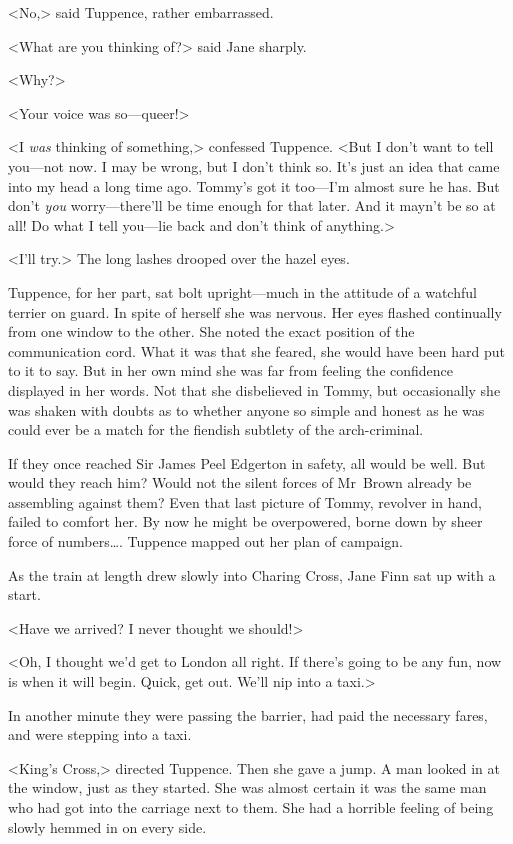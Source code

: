 <No,> said Tuppence, rather embarrassed.

<What are you thinking of?> said Jane sharply.

<Why?>

<Your voice was so—queer!>

<I \emph{was} thinking of something,> confessed Tuppence. <But I don't want to tell you—not now. I may be wrong, but I don't think so. It's just an idea that came into my head a long time ago. Tommy's got it too—I'm almost sure he has. But don't \emph{you} worry—there'll be time enough for that later. And it mayn't be so at all! Do what I tell you—lie back and don't think of anything.>

<I'll try.> The long lashes drooped over the hazel eyes.

Tuppence, for her part, sat bolt upright—much in the attitude of a watchful terrier on guard. In spite of herself she was nervous. Her eyes flashed continually from one window to the other. She noted the exact position of the communication cord. What it was that she feared, she would have been hard put to it to say. But in her own mind she was far from feeling the confidence displayed in her words. Not that she disbelieved in Tommy, but occasionally she was shaken with doubts as to whether anyone so simple and honest as he was could ever be a match for the fiendish subtlety of the arch-criminal.

If they once reached Sir James Peel Edgerton in safety, all would be well. But would they reach him? Would not the silent forces of Mr~Brown already be assembling against them? Even that last picture of Tommy, revolver in hand, failed to comfort her. By now he might be overpowered, borne down by sheer force of numbers\dots. Tuppence mapped out her plan of campaign.

As the train at length drew slowly into Charing Cross, Jane Finn sat up with a start.

<Have we arrived? I never thought we should!>

<Oh, I thought we'd get to London all right. If there's going to be any fun, now is when it will begin. Quick, get out. We'll nip into a taxi.>

In another minute they were passing the barrier, had paid the necessary fares, and were stepping into a taxi.

<King's Cross,> directed Tuppence. Then she gave a jump. A man looked in at the window, just as they started. She was almost certain it was the same man who had got into the carriage next to them. She had a horrible feeling of being slowly hemmed in on every side.

